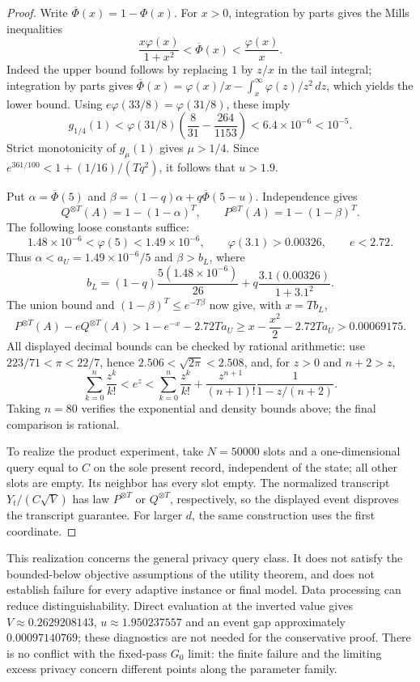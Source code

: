 \documentclass[11pt]{article}
\begin{document}
\begin{proof}
Write $\overline\Phi(x)=1-\Phi(x)$. For $x>0$, integration by parts gives
the Mills inequalities
\[
 \frac{x\varphi(x)}{1+x^2}<\overline\Phi(x)<\frac{\varphi(x)}x.
\]
Indeed the upper bound follows by replacing $1$ by $z/x$ in the tail
integral; integration by parts gives
$\overline\Phi(x)=\varphi(x)/x-\int_x^\infty\varphi(z)/z^2\,dz$,
which yields the lower bound.
Using $e\varphi(33/8)=\varphi(31/8)$, these imply
\[
 g_{1/4}(1)
 <\varphi(31/8)\left(\frac8{31}-\frac{264}{1153}\right)
 <6.4\times10^{-6}<10^{-5}.
\]
Strict monotonicity of $g_\mu(1)$ gives $\mu>1/4$.
Since $e^{361/100}<1+(1/16)/(Tq^2)$, it follows that $u>1.9$.

Put $\alpha=\overline\Phi(5)$ and
$\beta=(1-q)\alpha+q\overline\Phi(5-u)$.
Independence gives
\[
 Q^{\otimes T}(A)=1-(1-\alpha)^T,\qquad
 P^{\otimes T}(A)=1-(1-\beta)^T.
\]
The following loose constants suffice:
\[
 1.48\times10^{-6}<\varphi(5)<1.49\times10^{-6},\qquad
 \varphi(3.1)>0.00326,\qquad e<2.72.
\]
Thus $\alpha<a_U=1.49\times10^{-6}/5$ and $\beta>b_L$, where
\[
 b_L=(1-q)\frac{5(1.48\times10^{-6})}{26}
       +q\frac{3.1(0.00326)}{1+3.1^2}.
\]
The union bound and $(1-\beta)^T\le e^{-T\beta}$ now give, with $x=Tb_L$,
\[
 P^{\otimes T}(A)-eQ^{\otimes T}(A)
 >1-e^{-x}-2.72Ta_U
 \ge x-\frac{x^2}{2}-2.72Ta_U
 >0.00069175.
\]
All displayed decimal bounds can be checked by rational arithmetic:
use $223/71<\pi<22/7$, hence $2.506<\sqrt{2\pi}<2.508$, and, for
$z>0$ and $n+2>z$,
\[
 \sum_{k=0}^n\frac{z^k}{k!}<e^z<
 \sum_{k=0}^n\frac{z^k}{k!}
 +\frac{z^{n+1}}{(n+1)!}\frac1{1-z/(n+2)}.
\]
Taking $n=80$ verifies the exponential and density bounds above; the final
comparison is rational.

To realize the product experiment, take $N=50000$ slots and a one-dimensional
query equal to $C$ on the sole present record, independent of the state;
all other slots are empty. Its neighbor has every slot empty. The normalized
transcript $Y_t/(C\sqrt V)$ has law $P^{\otimes T}$ or $Q^{\otimes T}$,
respectively, so the displayed event disproves the transcript guarantee.
For larger $d$, the same construction uses the first coordinate.
\end{proof}

This realization concerns the general privacy query class. It does not
satisfy the bounded-below objective assumptions of the utility theorem,
and does not establish failure for every adaptive instance or final model.
Data processing can reduce distinguishability. Direct evaluation at the
inverted value gives $V\approx0.2629208143$, $u\approx1.950237557$ and an
event gap approximately $0.00097140769$; these diagnostics are not needed
for the conservative proof. There is no conflict with the fixed-pass
$G_0$ limit: the finite failure and the limiting excess privacy concern
different points along the parameter family.
\end{document}
